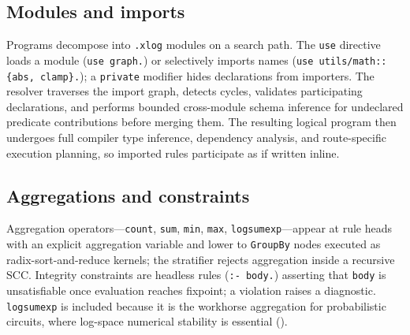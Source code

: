 

\subsection{Modules and imports}\label{sec:lang:modules}

Programs decompose into \texttt{.xlog} modules on a search path. The \texttt{use} directive loads a module (\texttt{use graph.}) or selectively imports names (\texttt{use utils/math::\{abs, clamp\}.}); a \texttt{private} modifier hides declarations from importers. The resolver traverses the import graph, detects cycles, validates participating declarations, and performs bounded cross-module schema inference for undeclared predicate contributions before merging them. The resulting logical program then undergoes full compiler type inference, dependency analysis, and route-specific execution planning, so imported rules participate as if written inline.





\subsection{Aggregations and constraints}\label{sec:lang:agg}

Aggregation operators---\texttt{count}, \texttt{sum}, \texttt{min}, \texttt{max}, \texttt{logsumexp}---appear at rule heads with an explicit aggregation variable and lower to \texttt{GroupBy} nodes executed as radix-sort-and-reduce kernels; the stratifier rejects aggregation inside a recursive SCC. Integrity constraints are headless rules (\texttt{:- body.}) asserting that \texttt{body} is unsatisfiable once evaluation reaches fixpoint; a violation raises a diagnostic. \texttt{logsumexp} is included because it is the workhorse aggregation for probabilistic circuits, where log-space numerical stability is essential ().


